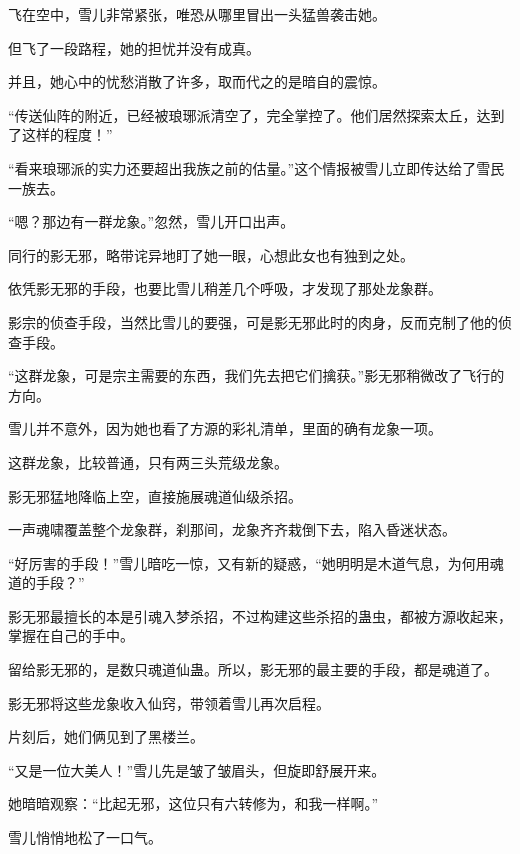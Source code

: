\begin{this_body}
飞在空中，雪儿非常紧张，唯恐从哪里冒出一头猛兽袭击她。

但飞了一段路程，她的担忧并没有成真。

并且，她心中的忧愁消散了许多，取而代之的是暗自的震惊。

“传送仙阵的附近，已经被琅琊派清空了，完全掌控了。他们居然探索太丘，达到了这样的程度！”

“看来琅琊派的实力还要超出我族之前的估量。”这个情报被雪儿立即传达给了雪民一族去。

“嗯？那边有一群龙象。”忽然，雪儿开口出声。

同行的影无邪，略带诧异地盯了她一眼，心想此女也有独到之处。

依凭影无邪的手段，也要比雪儿稍差几个呼吸，才发现了那处龙象群。

影宗的侦查手段，当然比雪儿的要强，可是影无邪此时的肉身，反而克制了他的侦查手段。

“这群龙象，可是宗主需要的东西，我们先去把它们擒获。”影无邪稍微改了飞行的方向。

雪儿并不意外，因为她也看了方源的彩礼清单，里面的确有龙象一项。

这群龙象，比较普通，只有两三头荒级龙象。

影无邪猛地降临上空，直接施展魂道仙级杀招。

一声魂啸覆盖整个龙象群，刹那间，龙象齐齐栽倒下去，陷入昏迷状态。

“好厉害的手段！”雪儿暗吃一惊，又有新的疑惑，“她明明是木道气息，为何用魂道的手段？”

影无邪最擅长的本是引魂入梦杀招，不过构建这些杀招的蛊虫，都被方源收起来，掌握在自己的手中。

留给影无邪的，是数只魂道仙蛊。所以，影无邪的最主要的手段，都是魂道了。

影无邪将这些龙象收入仙窍，带领着雪儿再次启程。

片刻后，她们俩见到了黑楼兰。

“又是一位大美人！”雪儿先是皱了皱眉头，但旋即舒展开来。

她暗暗观察：“比起无邪，这位只有六转修为，和我一样啊。”

雪儿悄悄地松了一口气。

\end{this_body}

